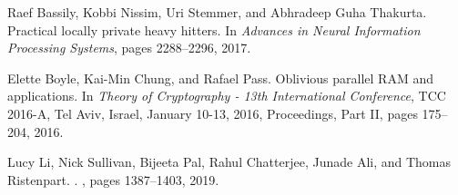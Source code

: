 \documentclass[11pt]{article}  %
\begin{document}
\begin{thebibliography}{10}
\begin{small}
 Raef Bassily, Kobbi Nissim, Uri Stemmer, and Abhradeep Guha Thakurta. \newblock  Practical locally private heavy hitters. \newblock In {\em Advances in Neural Information Processing Systems}, pages 2288–2296, 2017.

 Elette Boyle, Kai-Min Chung, and Rafael Pass. \newblock  Oblivious parallel RAM and applications.  \newblock In {\em Theory of Cryptography - 13th International Conference}, TCC 2016-A, Tel Aviv, Israel, January 10-13, 2016, Proceedings, Part II, pages 175–204, 2016.



Lucy Li, Nick Sullivan, Bijeeta Pal, Rahul Chatterjee, Junade Ali, and Thomas
  Ristenpart.
.
, pages 1387--1403, 2019.


 
\end{small}
\end{thebibliography}
\end{document}
